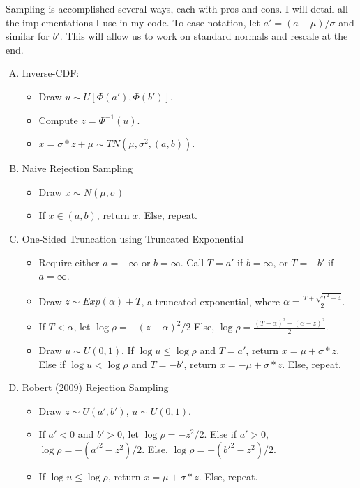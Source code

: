 \documentclass[12pt]{article}
\begin{document}
Sampling is accomplished several ways, each with pros and cons. I will detail all the implementations I use in my code. To ease notation, let $a' = (a-\mu)/\sigma$ and similar for $b'$. This will allow us to work on standard normals and rescale at the end.
\begin{enumerate}[A.]
\item Inverse-CDF:
	\begin{itemize}
	\item Draw $u \sim U[\Phi(a'), \Phi(b')]$.
	\item Compute $z = \Phi^{-1}(u)$.
	\item $x = \sigma * z + \mu \sim TN(\mu, \sigma^2, (a,b))$.
	\end{itemize}
\item Naive Rejection Sampling
	\begin{itemize}
	\item Draw $x \sim N(\mu, \sigma)$
	\item If $x \in (a,b)$, return $x$. Else, repeat.	
	\end{itemize}
\item One-Sided Truncation using Truncated Exponential
	\begin{itemize}
	\item Require either $a = -\infty$ or $b  = \infty$. Call $T = a'$ if $b=\infty$, or $T=-b'$ if $a=\infty$.
	\item Draw $z \sim Exp(\alpha) + T$, a truncated exponential, where $\alpha = \frac{T + \sqrt{T^2 + 4}}{2}$.
	\item If $T < \alpha$, let $\log \rho = - (z-\alpha)^2 /2$ Else, $\log \rho = \frac{(T-\alpha)^2 - (\alpha -z)^2}{2}$.
	\item Draw $u \sim U(0,1)$. If $\log{u} \leq \log \rho$ and $T=a'$, return $x = \mu + \sigma * z$. Else if $\log{u} < \log \rho$ and $T=-b'$, return $x = -\mu + \sigma * z$. Else, repeat.
	\end{itemize}
\item Robert (2009) Rejection Sampling
	\begin{itemize}
	\item Draw $z \sim U(a', b')$, $u \sim U(0,1)$.
	\item If $a' < 0$ and $b' > 0$, let $\log \rho = -z^2 /2$. Else if $a' > 0$, $\log \rho = - ({a'}^2 - z^2) /2$. Else, $\log \rho = - ({b'}^2 - z^2) /2$.
	\item If $\log u \leq \log \rho$, return $x = \mu + \sigma * z$. Else, repeat.
	\end{itemize}
\end{enumerate}
\end{document}
